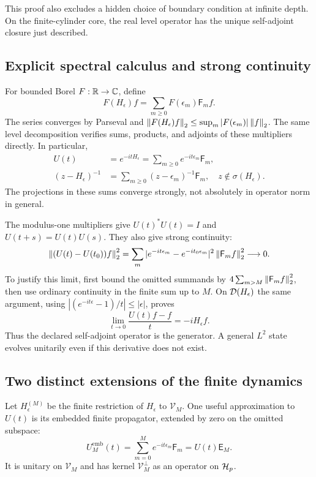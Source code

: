This proof also excludes a hidden choice of boundary condition at infinite
depth. On the finite-cylinder core, the real level operator has the unique
self-adjoint closure just described.

\subsection{Explicit spectral calculus and strong continuity}

For bounded Borel $F:\mathbb R\to\mathbb C$, define
\begin{equation}
 F(H_\epsilon)f=\sum_{m\geq0}F(\epsilon_m)\mathsf F_mf.
 \label{a-limit-borel-calculus}
\end{equation}
The series converges by Parseval and
$\left\lVert F(H_\epsilon)f\right\rVert_2\leq\sup_m|F(\epsilon_m)|\left\lVert f\right\rVert_2$.
The same level decomposition verifies sums, products, and adjoints of
these multipliers directly. In particular,
\begin{align}
 U(t)&=e^{-itH_\epsilon}
 =\sum_{m\geq0}e^{-it\epsilon_m}\mathsf F_m,
 \label{a-limit-unitary}\\
 (z-H_\epsilon)^{-1}
 &=\sum_{m\geq0}(z-\epsilon_m)^{-1}\mathsf F_m,
 \quad z\notin\sigma(H_\epsilon).
 \label{a-limit-resolvent}
\end{align}
The projections in these sums converge strongly, not absolutely in
operator norm in general.

The modulus-one multipliers give $U(t)^*U(t)=I$ and
$U(t+s)=U(t)U(s)$. They also give strong continuity:
\[
 \left\lVert(U(t)-U(t_0))f\right\rVert_2^2
 =\sum_m|e^{-it\epsilon_m}-e^{-it_0\epsilon_m}|^2
 \left\lVert\mathsf F_mf\right\rVert_2^2\longrightarrow0.
\]
To justify this limit, first bound the omitted summands by
$4\sum_{m>M}\left\lVert\mathsf F_mf\right\rVert_2^2$, then use ordinary continuity in
the finite sum up to $M$. On $\mathcal D(H_\epsilon)$ the same argument,
using $|(e^{-it\epsilon}-1)/t|\leq|\epsilon|$, proves
\[
 \lim_{t\to0}\frac{U(t)f-f}{t}=-iH_\epsilon f.
\]
Thus the declared self-adjoint operator is the generator. A general
$L^2$ state evolves unitarily even if this derivative does not exist.

\subsection{Two distinct extensions of the finite dynamics}

Let $H_\epsilon^{(M)}$ be the finite restriction of $H_\epsilon$ to
$\mathcal V_M$. One useful approximation to $U(t)$ is its embedded
finite propagator, extended by zero on the omitted subspace:
\begin{equation}
 U_M^{\mathrm{emb}}(t)
 =\sum_{m=0}^{M}e^{-it\epsilon_m}\mathsf F_m
 =U(t)\mathsf E_M.
 \label{a-limit-embedded-propagator}
\end{equation}
It is unitary on $\mathcal V_M$ and has kernel
$\mathcal V_M^\perp$ as an operator on $\mathcal H_p$.

